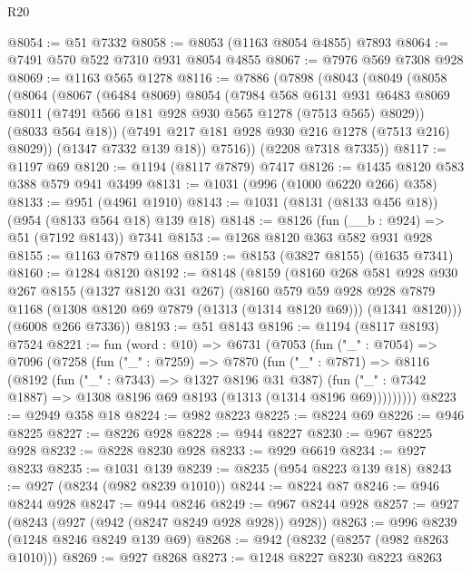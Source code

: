 \begin{lexlean}{R20}
\begin{coremodule}
@8054 := @51 @7332
@8058 := @8053 (@1163 @8054 @4855) @7893
@8064 := @7491 @570 @522 @7310 @931 @8054 @4855
@8067 := @7976 @569 @7308 @928
@8069 := @1163 @565 @1278
@8116 := @7886
    (@7898
      (@8043
        (@8049
          (@8058
            (@8064
              (@8067
                (@6484 @8069)
                @8054
                (@7984
                  @568
                  @6131
                  @931
                  @6483
                  @8069
                  @8011
                  (@7491 @566 @181 @928 @930 @565 @1278 (@7513 @565) @8029))
                (@8033 @564 @18))
              (@7491 @217 @181 @928 @930 @216 @1278 (@7513 @216) @8029))
            (@1347 @7332 @139 @18))
          @7516))
      (@2208 @7318 @7335))
@8117 := @1197 @69
@8120 := @1194 (@8117 @7879) @7417
@8126 := @1435 @8120 @583 @388 @579 @941 @3499
@8131 := @1031 (@996 (@1000 @6220 @266) @358)
@8133 := @951 (@4961 @1910)
@8143 := @1031 (@8131 (@8133 @456 @18)) (@954 (@8133 @564 @18) @139 @18)
@8148 := @8126 (fun (__b : @924) => @51 (@7192 @8143)) @7341
@8153 := @1268 @8120 @363 @582 @931 @928
@8155 := @1163 @7879 @1168
@8159 := @8153 (@3827 @8155) (@1635 @7341)
@8160 := @1284 @8120
@8192 := @8148
    (@8159
      (@8160
        @268
        @581
        @928
        @930
        @267
        @8155
        (@1327 @8120 @31 @267)
        (@8160
          @579
          @59
          @928
          @928
          @7879
          @1168
          (@1308 @8120 @69 @7879 (@1313 (@1314 @8120 @69)))
          (@1341 @8120)))
      (@6008 @266 @7336))
@8193 := @51 @8143
@8196 := @1194 (@8117 @8193) @7524
@8221 := fun (word : @10) =>
  @6731
    (@7053
      (fun ("_" : @7054) =>
      @7096
        (@7258
          (fun ("_" : @7259) =>
          @7870
            (fun ("_" : @7871) =>
            @8116
              (@8192
                (fun ("_" : @7343) => @1327 @8196 @31 @387)
                (fun ("_" : @7342 @1887) => @1308 @8196 @69 @8193 (@1313 (@1314 @8196 @69)))))))))
@8223 := @2949 @358 @18
@8224 := @982 @8223
@8225 := @8224 @69
@8226 := @946 @8225
@8227 := @8226 @928
@8228 := @944 @8227
@8230 := @967 @8225 @928
@8232 := @8228 @8230 @928
@8233 := @929 @6619
@8234 := @927 @8233
@8235 := @1031 @139
@8239 := @8235 (@954 @8223 @139 @18)
@8243 := @927 (@8234 (@982 @8239 @1010))
@8244 := @8224 @87
@8246 := @946 @8244 @928
@8247 := @944 @8246
@8249 := @967 @8244 @928
@8257 := @927 (@8243 (@927 (@942 (@8247 @8249 @928 @928)) @928))
@8263 := @996 @8239 (@1248 @8246 @8249 @139 @69)
@8268 := @942 (@8232 (@8257 (@982 @8263 @1010)))
@8269 := @927 @8268
@8273 := @1248 @8227 @8230 @8223 @8263

\end{coremodule}
\end{lexlean}
